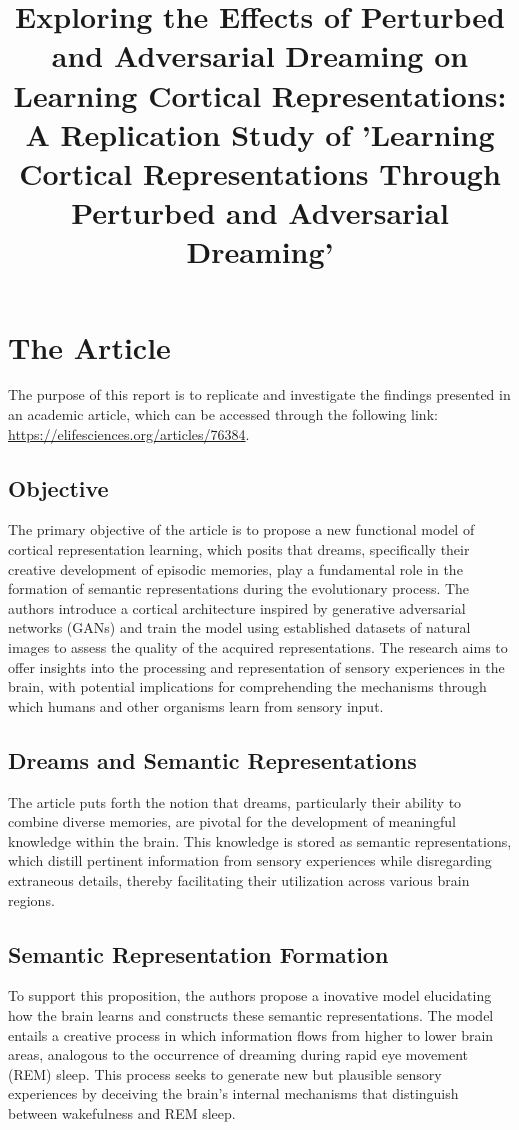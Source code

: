 \documentclass{midl} %
\title[Exploring the Effects of Perturbed and Adversarial Dreaming]{Exploring the Effects of Perturbed and Adversarial Dreaming on Learning Cortical Representations: A Replication Study of 'Learning Cortical Representations Through Perturbed and Adversarial Dreaming'}
\begin{document}
\maketitle


\section{The Article}
The purpose of this report is to replicate and investigate the findings presented in an academic article, which can be accessed through the following link: \url{https://elifesciences.org/articles/76384}.

\subsection{Objective}
The primary objective of the article is to propose a new functional model of cortical representation learning, which posits that dreams, specifically their creative development of episodic memories, play a fundamental role in the formation of semantic representations during the evolutionary process. The authors introduce a cortical architecture inspired by generative adversarial networks (GANs) and train the model using established datasets of natural images to assess the quality of the acquired representations. The research aims to offer insights into the processing and representation of sensory experiences in the brain, with potential implications for comprehending the mechanisms through which humans and other organisms learn from sensory input.

\subsection{Dreams and Semantic Representations}
The article puts forth the notion that dreams, particularly their ability to combine diverse memories, are pivotal for the development of meaningful knowledge within the brain. This knowledge is stored as semantic representations, which distill pertinent information from sensory experiences while disregarding extraneous details, thereby facilitating their utilization across various brain regions.

\subsection{Semantic Representation Formation}
To support this proposition, the authors propose a inovative model elucidating how the brain learns and constructs these semantic representations. The model entails a creative process in which information flows from higher to lower brain areas, analogous to the occurrence of dreaming during rapid eye movement (REM) sleep. This process seeks to generate new but plausible sensory experiences by deceiving the brain's internal mechanisms that distinguish between wakefulness and REM sleep.
\end{document}
